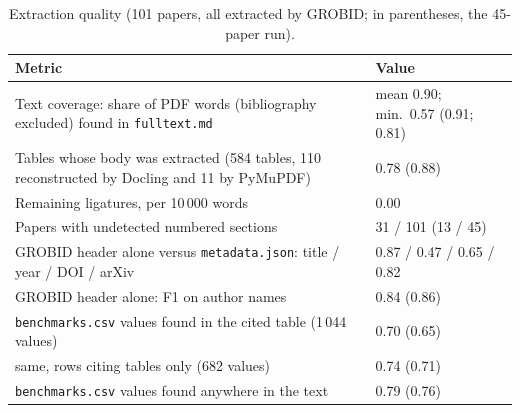 \documentclass[11pt,a4paper]{article}
\newcommand{\cmd}[1]{\texttt{#1}}
\begin{document}
\begin{table}[ht]
\centering
\caption{Extraction quality (101 papers, all extracted by GROBID; in parentheses, the
45-paper run).}
\label{tab:extraction}
\small
\begin{tabularx}{\linewidth}{@{}Ll@{}}
\toprule
Metric & Value \\
\midrule
Text coverage: share of PDF words (bibliography excluded) found in \cmd{fulltext.md} & mean 0.90; min.\ 0.57 (0.91; 0.81) \\
Tables whose body was extracted (584 tables, 110 reconstructed by Docling and 11 by PyMuPDF) & 0.78 (0.88) \\
Remaining ligatures, per 10\,000 words & 0.00 \\
Papers with undetected numbered sections & 31 / 101 (13 / 45) \\
GROBID header alone versus \cmd{metadata.json}: title / year / DOI / arXiv & 0.87 / 0.47 / 0.65 / 0.82 \\
GROBID header alone: F1 on author names & 0.84 (0.86) \\
\cmd{benchmarks.csv} values found in the cited table (1\,044 values) & 0.70 (0.65) \\
\quad same, rows citing tables only (682 values) & 0.74 (0.71) \\
\cmd{benchmarks.csv} values found anywhere in the text & 0.79 (0.76) \\
\bottomrule
\end{tabularx}
\end{table}
\end{document}
